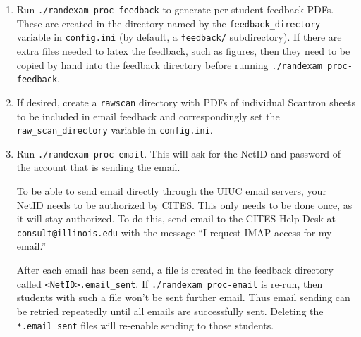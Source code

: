 \documentclass{article}
\begin{document}
\begin{enumerate}
\item Run \texttt{./randexam proc-feedback} to generate per-student
  feedback PDFs. These are created in the directory named by the
  \texttt{feedback_directory} variable in \texttt{config.ini} (by
  default, a \texttt{feedback/} subdirectory). If there are extra
  files needed to latex the feedback, such as figures, then they need
  to be copied by hand into the feedback directory before running
  \texttt{./randexam proc-feedback}.
\item If desired, create a \verb+rawscan+ directory with PDFs of
  individual Scantron sheets to be included in email feedback and
  correspondingly set the \texttt{raw_scan_directory} variable in
  \texttt{config.ini}.
\item Run \texttt{./randexam proc-email}. This will ask for the NetID
  and password of the account that is sending the email.

  To be able to send email directly through the UIUC email servers,
  your NetID needs to be authorized by CITES. This only needs to be
  done once, as it will stay authorized. To do this, send email to the
  CITES Help Desk at \texttt{consult@illinois.edu} with the message
  ``I request IMAP access for my email.''

  After each email has been send, a file is created in the feedback
  directory called \texttt{<NetID>.email_sent}. If \texttt{./randexam
    proc-email} is re-run, then students with such a file won't be
  sent further email. Thus email sending can be retried repeatedly
  until all emails are successfully sent. Deleting the
  \texttt{*.email_sent} files will re-enable sending to those students.
\end{enumerate}
\end{document}
